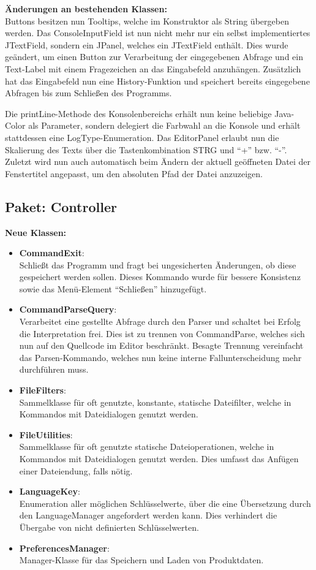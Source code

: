 \documentclass[parskip=full,11pt,twoside]{scrartcl}
\begin{document}
\textbf{Änderungen an bestehenden Klassen:}\\
Buttons besitzen nun Tooltips, welche im Konstruktor als String übergeben werden. Das ConsoleInputField ist nun nicht mehr nur ein selbst implementiertes JTextField, sondern ein JPanel, welches ein JTextField enthält. Dies wurde geändert, um einen Button zur Verarbeitung der eingegebenen Abfrage und ein Text-Label mit einem Fragezeichen an das Eingabefeld anzuhängen. Zusätzlich hat das Eingabefeld nun eine History-Funktion und speichert bereits eingegebene Abfragen bis zum Schließen des Programms.

Die printLine-Methode des Konsolenbereichs erhält nun keine beliebige Java-Color als Parameter, sondern delegiert die Farbwahl an die Konsole und erhält stattdessen eine LogType-Enumeration. Das EditorPanel erlaubt nun die Skalierung des Texts über die Tastenkombination STRG und \enquote{+} bzw. \enquote{-}. Zuletzt wird nun auch automatisch beim Ändern der aktuell geöffneten Datei der Fenstertitel angepasst, um den absoluten Pfad der Datei anzuzeigen.

\subsection{Paket: Controller}
\textbf{Neue Klassen:}\\
\begin{itemize}
	\item \textbf{CommandExit}:\\
	Schließt das Programm und fragt bei ungesicherten Änderungen, ob diese gespeichert werden sollen. Dieses Kommando wurde für bessere Konsistenz sowie das Menü-Element \enquote{Schließen} hinzugefügt.
	\item \textbf{CommandParseQuery}:\\
	Verarbeitet eine gestellte Abfrage durch den Parser und schaltet bei Erfolg die Interpretation frei. Dies ist zu trennen von CommandParse, welches sich nun auf den Quellcode im Editor beschränkt. Besagte Trennung vereinfacht das Parsen-Kommando, welches nun keine interne Fallunterscheidung mehr durchführen muss.
	\item \textbf{FileFilters}:\\
	Sammelklasse für oft genutzte, konstante, statische Dateifilter, welche in Kommandos mit Dateidialogen genutzt werden.
	\item \textbf{FileUtilities}:\\
	Sammelklasse für oft genutzte statische Dateioperationen, welche in Kommandos mit Dateidialogen genutzt werden. Dies umfasst das Anfügen einer Dateiendung, falls nötig.
	\item \textbf{LanguageKey}:\\
	Enumeration aller möglichen Schlüsselwerte, über die eine Übersetzung durch den LanguageManager angefordert werden kann. Dies verhindert die Übergabe von nicht definierten Schlüsselwerten.
	\item \textbf{PreferencesManager}:\\
	Manager-Klasse für das Speichern und Laden von Produktdaten.
\end{itemize}
\end{document}
